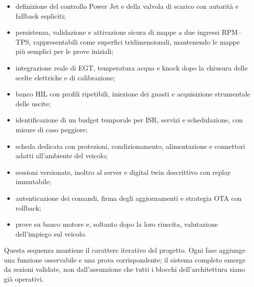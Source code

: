 \documentclass{article}
\begin{document}
\begin{itemize}
    \item definizione del controllo Power Jet e della valvola di scarico con
          autorità e fallback espliciti;
    \item persistenza, validazione e attivazione sicura di mappe a due ingressi
          RPM--TPS, rappresentabili come superfici tridimensionali, mantenendo
          le mappe più semplici per le prove iniziali;
    \item integrazione reale di EGT, temperatura acqua e knock dopo la chiusura
          delle scelte elettriche e di calibrazione;
    \item banco HIL con profili ripetibili, iniezione dei guasti e acquisizione
          strumentale delle uscite;
    \item identificazione di un budget temporale per ISR, servizi e
          schedulazione, con misure di caso peggiore;
    \item scheda dedicata con protezioni, condizionamento, alimentazione e
          connettori adatti all'ambiente del veicolo;
    \item sessioni versionate, inoltro al server e digital twin descrittivo con
          replay immutabile;
    \item autenticazione dei comandi, firma degli aggiornamenti e strategia OTA
          con rollback;
    \item prove su banco motore e, soltanto dopo la loro riuscita, valutazione
          dell'impiego sul veicolo.
\end{itemize}

Questa sequenza mantiene il carattere iterativo del progetto. Ogni fase aggiunge
una funzione osservabile e una prova corrispondente; il sistema completo emerge
da sezioni validate, non dall'assunzione che tutti i blocchi dell'architettura siano
già operativi.
\end{document}
